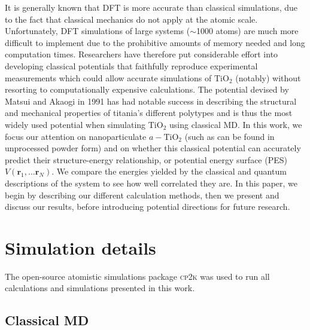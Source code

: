 \documentclass[aps,prb,twocolumn,amsmath,amssymb,superscriptaddress,longbibliography]{revtex4-1}
\begin{document}
It is generally known that DFT is more accurate than classical simulations, due to the fact that classical mechanics do not apply at the atomic scale.
Unfortunately, DFT simulations of large systems ($\sim$1000 atoms) are much more difficult to implement due to the prohibitive amounts of memory needed and long computation times.
Researchers have therefore put considerable effort into developing classical potentials that faithfully reproduce experimental measurements which could allow accurate simulations of $\text{TiO}_2$ (notably) without resorting to computationally expensive calculations\cite{kim,MA_og,opt_FF}.
The potential devised by Matsui and Akaogi in 1991\cite{MA_og} has had notable success in describing the structural and mechanical properties of titania's different polytypes\cite{smith_collins,vvh1} and is thus the most widely used potential when simulating $\text{TiO}_2$ using classical MD. 
In this work, we focus our attention on nanoparticulate $a-\text{TiO}_2$ (such as can be found in unprocessed powder form) and on whether this classical potential can accurately predict their structure-energy relationship, or potential energy surface (PES) ${V(\textbf{r}_1,...\textbf{r}_N)}$.
We compare the energies yielded by the classical and quantum descriptions of the system to see how well correlated they are.
In this paper, we begin by describing our different calculation methods, then we present and discuss our results, before introducing potential directions for future research.




\section*{Simulation details}

The open-source atomistic simulations package \textsc{cp2k}\cite{cp2k} was used to run all calculations and simulations presented in this work.

\subsection{Classical MD}
\end{document}

